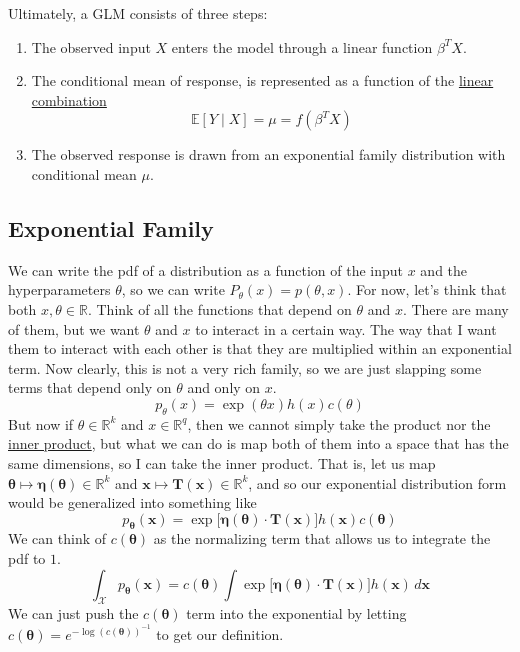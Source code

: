   Ultimately, a GLM consists of three steps: 
  \begin{enumerate}
    \item The observed input $X$ enters the model through a linear function $\beta^T X$. 
    \item The conditional mean of response, is represented as a function of the \hyperref[lin-def:linear-combination]{linear combination} 
      \begin{equation}
        \mathbb{E}[Y \mid X] = \mu = f(\beta^T X)
      \end{equation}
    \item The observed response is drawn from an exponential family distribution with conditional mean $\mu$. 
  \end{enumerate}

\subsection{Exponential Family}

  We can write the pdf of a distribution as a function of the input $x$ and the hyperparameters $\theta$, so we can write $P_\theta (x) = p(\theta, x)$. For now, let's think that both $x, \theta \in \mathbb{R}$. Think of all the functions that depend on $\theta$ and $x$. There are many of them, but we want $\theta$ and $x$ to interact in a certain way. The way that I want them to interact with each other is that they are multiplied within an exponential term. Now clearly, this is not a very rich family, so we are just slapping some terms that depend only on $\theta$ and only on $x$. 
  \begin{equation}
    p_\theta (x) = \exp(\theta x) h(x) c(\theta)
  \end{equation}
  But now if $\theta \in \mathbb{R}^k$ and $x \in \mathbb{R}^q$, then we cannot simply take the product nor the \hyperref[lin-def:inner-product]{inner product}, but what we can do is map both of them into a space that has the same dimensions, so I can take the inner product. That is, let us map $\boldsymbol{\theta} \mapsto \boldsymbol{\eta}(\boldsymbol{\theta}) \in \mathbb{R}^k$ and $\mathbf{x} \mapsto \mathbf{T}(\mathbf{x}) \in \mathbb{R}^k$, and so 
  our exponential distribution form would be generalized into something like 
  \begin{equation}
    p_{\boldsymbol{\theta}} (\mathbf{x}) = \exp\big[ \boldsymbol{\eta}(\boldsymbol{\theta}) \cdot \mathbf{T}(\mathbf{x}) \big] h(\mathbf{x}) c(\boldsymbol{\theta})
  \end{equation}
  We can think of $c(\boldsymbol{\theta})$ as the normalizing term that allows us to integrate the pdf to $1$. 
  \begin{equation}
    \int_\mathcal{X} p_{\boldsymbol{\theta}} (\mathbf{x}) = c(\boldsymbol{\theta}) \int \exp\big[\boldsymbol{\eta}(\boldsymbol{\theta}) \cdot \mathbf{T}(\mathbf{x}) \big] h(\mathbf{x})  \,d\mathbf{x}
  \end{equation}
  We can just push the $c(\boldsymbol{\theta})$ term into the exponential by letting $c(\boldsymbol{\theta}) = e^{-\log(c(\boldsymbol{\theta}))^{-1}}$ to get our definition. 

